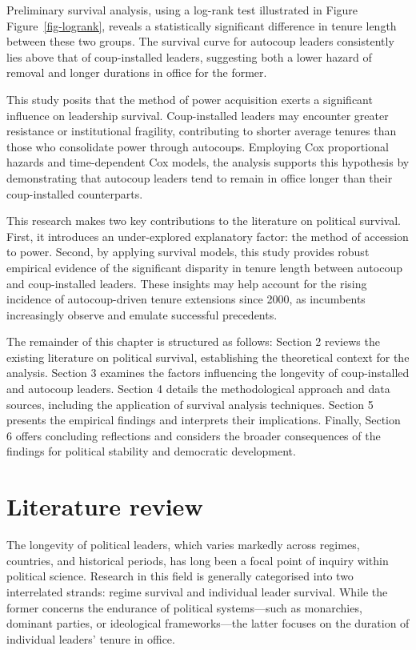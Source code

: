 \documentclass[
  12pt,
]{report}
\begin{document}
Preliminary survival analysis, using a log-rank test illustrated in
Figure Figure~\ref{fig-logrank}, reveals a statistically significant
difference in tenure length between these two groups. The survival curve
for autocoup leaders consistently lies above that of coup-installed
leaders, suggesting both a lower hazard of removal and longer durations
in office for the former.

This study posits that the method of power acquisition exerts a
significant influence on leadership survival. Coup-installed leaders may
encounter greater resistance or institutional fragility, contributing to
shorter average tenures than those who consolidate power through
autocoups. Employing Cox proportional hazards and time-dependent Cox
models, the analysis supports this hypothesis by demonstrating that
autocoup leaders tend to remain in office longer than their
coup-installed counterparts.

This research makes two key contributions to the literature on political
survival. First, it introduces an under-explored explanatory factor: the
method of accession to power. Second, by applying survival models, this
study provides robust empirical evidence of the significant disparity in
tenure length between autocoup and coup-installed leaders. These
insights may help account for the rising incidence of autocoup-driven
tenure extensions since 2000, as incumbents increasingly observe and
emulate successful precedents.

The remainder of this chapter is structured as follows: Section 2
reviews the existing literature on political survival, establishing the
theoretical context for the analysis. Section 3 examines the factors
influencing the longevity of coup-installed and autocoup leaders.
Section 4 details the methodological approach and data sources,
including the application of survival analysis techniques. Section 5
presents the empirical findings and interprets their implications.
Finally, Section 6 offers concluding reflections and considers the
broader consequences of the findings for political stability and
democratic development.

\section{Literature review}\label{literature-review}

The longevity of political leaders, which varies markedly across
regimes, countries, and historical periods, has long been a focal point
of inquiry within political science. Research in this field is generally
categorised into two interrelated strands: regime survival and
individual leader survival. While the former concerns the endurance of
political systems---such as monarchies, dominant parties, or ideological
frameworks---the latter focuses on the duration of individual leaders'
tenure in office.
\end{document}
